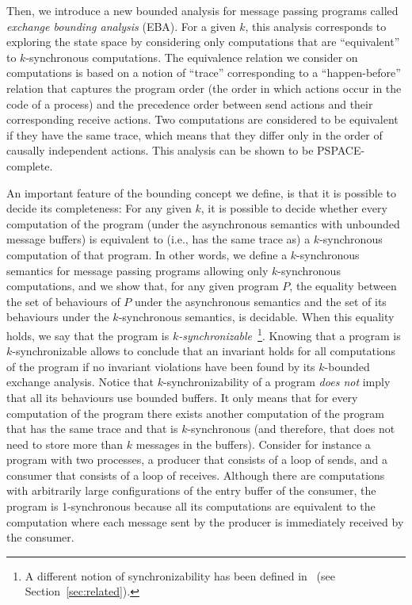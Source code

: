 Then, we introduce a new bounded analysis for message passing programs called {\em exchange bounding analysis} (EBA). For a given $k$, this analysis corresponds to exploring the state space by considering only computations that are “equivalent” to $k$-synchronous computations. The equivalence relation we consider on computations is based on a notion of “trace” corresponding to a “happen-before” relation that captures the program order (the order in which actions occur in the code of a process) and the precedence order between send actions and their corresponding receive actions. Two computations are considered to be equivalent if they have the same trace, which means that they differ only in the order of causally independent actions. This analysis can be shown to be PSPACE-complete. 
%

An important feature of the bounding concept we define, is that it is possible to decide its completeness: For any given $k$, it is possible to decide whether every computation of the program (under the asynchronous semantics with unbounded message buffers) is equivalent to (i.e., has the same trace as) a $k$-synchronous computation of that program. 
In other words, we define a $k$-synchronous semantics for message passing programs allowing only $k$-synchronous computations, and we show that, for any given program $P$, the equality between the set of behaviours of $P$ under the asynchronous semantics and the set of its behaviours under the $k$-synchronous semantics, is decidable. When this equality holds, we say that the program is {\em $k$-synchronizable}~\footnote{A different notion of synchronizability has been defined in~\cite{DBLP:journals/tcs/BasuB16} (see Section~\ref{sec:related}).}. Knowing that a program is $k$-synchronizable allows to conclude that an invariant holds for all computations of the program if no invariant violations have been found by its $k$-bounded exchange analysis. Notice that $k$-synchronizability of a program {\em does not} imply that all its behaviours use bounded buffers. It only means that for every computation of the program there exists another computation of the program that has the same trace and that is $k$-synchronous (and therefore, that does not need to store more than $k$ messages in the buffers). Consider for instance a program with two processes, a producer that consists of a loop of sends, and a consumer that consists of a loop of receives. Although there are computations with arbitrarily large configurations of the entry buffer of the consumer, the program is 1-synchronous because all its computations are equivalent to the computation where each message sent by the producer is immediately received by the consumer. 

